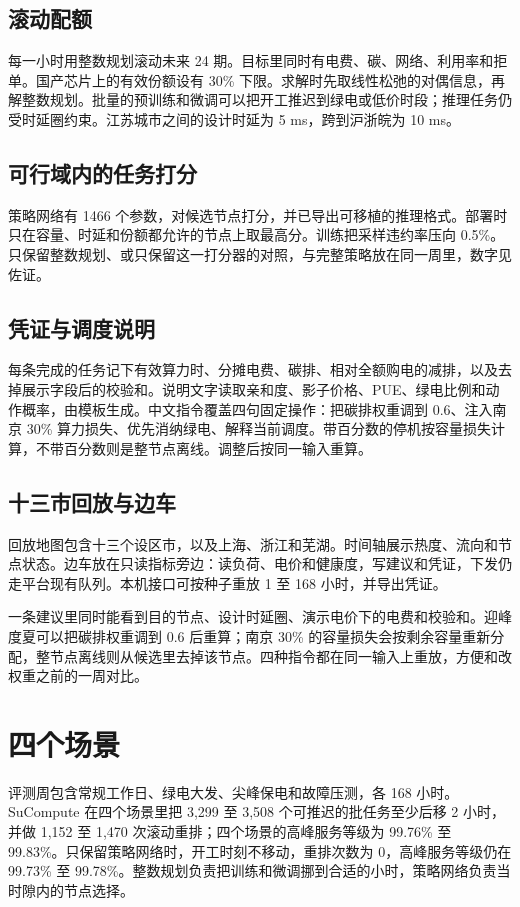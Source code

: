 \subsection{滚动配额}
每一小时用整数规划滚动未来 24 期。目标里同时有电费、碳、网络、利用率和拒单。国产芯片上的有效份额设有 30\% 下限。求解时先取线性松弛的对偶信息，再解整数规划。批量的预训练和微调可以把开工推迟到绿电或低价时段；推理任务仍受时延圈约束。江苏城市之间的设计时延为 5 ms，跨到沪浙皖为 10 ms。

\subsection{可行域内的任务打分}
策略网络有 1466 个参数，对候选节点打分，并已导出可移植的推理格式。部署时只在容量、时延和份额都允许的节点上取最高分。训练把采样违约率压向 0.5\%。只保留整数规划、或只保留这一打分器的对照，与完整策略放在同一周里，数字见佐证。

\subsection{凭证与调度说明}
每条完成的任务记下有效算力时、分摊电费、碳排、相对全额购电的减排，以及去掉展示字段后的校验和。说明文字读取亲和度、影子价格、PUE、绿电比例和动作概率，由模板生成。中文指令覆盖四句固定操作：把碳排权重调到 0.6、注入南京 30\% 算力损失、优先消纳绿电、解释当前调度。带百分数的停机按容量损失计算，不带百分数则是整节点离线。调整后按同一输入重算。

\subsection{十三市回放与边车}
回放地图包含十三个设区市，以及上海、浙江和芜湖。时间轴展示热度、流向和节点状态。边车放在只读指标旁边：读负荷、电价和健康度，写建议和凭证，下发仍走平台现有队列。本机接口可按种子重放 1 至 168 小时，并导出凭证。

一条建议里同时能看到目的节点、设计时延圈、演示电价下的电费和校验和。迎峰度夏可以把碳排权重调到 0.6 后重算；南京 30\% 的容量损失会按剩余容量重新分配，整节点离线则从候选里去掉该节点。四种指令都在同一输入上重放，方便和改权重之前的一周对比。

\section{四个场景}
评测周包含常规工作日、绿电大发、尖峰保电和故障压测，各 168 小时。SuCompute 在四个场景里把 3{,}299 至 3{,}508 个可推迟的批任务至少后移 2 小时，并做 1{,}152 至 1{,}470 次滚动重排；四个场景的高峰服务等级为 99.76\% 至 99.83\%。只保留策略网络时，开工时刻不移动，重排次数为 0，高峰服务等级仍在 99.73\% 至 99.78\%。整数规划负责把训练和微调挪到合适的小时，策略网络负责当时隙内的节点选择。

